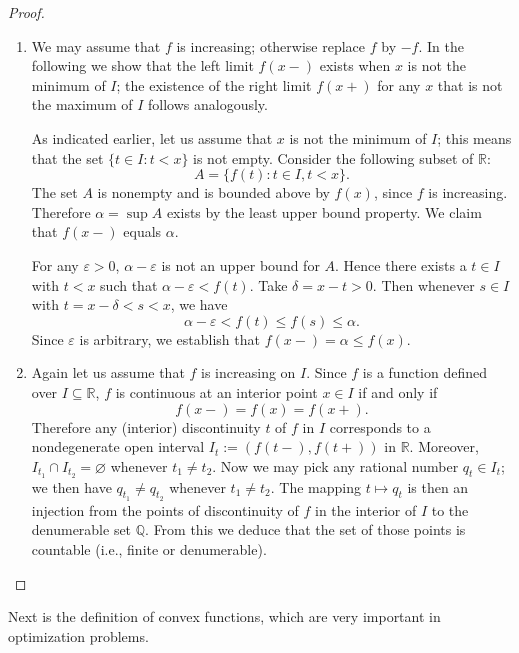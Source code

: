 \begin{proof}
  \begin{enumerate}[$(a)$]
    \item We may assume that $f$ is increasing; otherwise replace $f$ by $-f$.
      In the following we show that the left limit $f(x-)$ exists when $x$ is not the minimum of $I$; the existence of the right limit $f(x+)$ for any $x$ that is not the maximum of $I$ follows analogously. 

      As indicated earlier, let us assume that $x$ is not the minimum of $I$; this means that the set $\{ t \in I \colon t < x \}$ is not empty.
      Consider the following subset of $\mathbb{R}$:
      \[
	A = \{ f(t) \colon t \in I, t < x \}.
      \]
      The set $A$ is nonempty and is bounded above by $f(x)$, since $f$ is increasing.
      Therefore $\alpha = \sup A$ exists by the least upper bound property.
      We claim that $f(x-)$ equals $\alpha$.

      For any $\varepsilon > 0$, $\alpha - \varepsilon$ is not an upper bound for $A$.
      Hence there exists a $t \in I$ with $t < x$ such that $\alpha - \varepsilon < f(t)$.
      Take $\delta = x - t > 0$.  Then whenever $s \in I$ with $t = x - \delta < s < x$, we have
      \[
	\alpha - \varepsilon < f(t) \leqslant f(s) \leqslant \alpha.
      \]
      Since $\varepsilon$ is arbitrary, we establish that $f(x-) = \alpha \leqslant f(x)$. 

    \item Again let us assume that $f$ is increasing on $I$.
      Since $f$ is a function defined over $I \subseteq \mathbb{R}$, $f$ is continuous at an interior point $x \in I$ if and only if
      \[
	f(x-) = f(x) = f(x+).
      \]
      Therefore any (interior) discontinuity $t$ of $f$ in $I$ corresponds to a nondegenerate open interval $I_t := \left( f(t-), f(t+) \right)$ in $\mathbb{R}$.
      Moreover, $I_{t_1} \cap I_{t_2} = \varnothing$ whenever $t_1 \ne t_2$.
      Now we may pick any rational number $q_t \in I_t$; we then have $q_{t_1} \ne q_{t_2}$ whenever $t_1 \ne t_2$.
      The mapping $t \mapsto q_t$ is then an injection from the points of discontinuity of $f$ in the interior of $I$ to the denumerable set $\mathbb{Q}$.
      From this we deduce that the set of those points is countable (i.e., finite or denumerable).
  \end{enumerate}
\end{proof}

Next is the definition of convex functions, which are very important in optimization problems.

